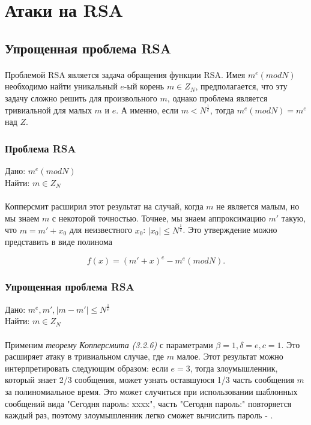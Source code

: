 
\section{Атаки на RSA}

\subsection{Упрощенная проблема RSA}

\paragraph{} Проблемой RSA является задача обращения функции RSA. Имея {$m^e (mod N)$} необходимо найти уникальный {$e$}-ый корень {$m \in Z_N$}, 
  предполагается, что эту задачу сложно решить для произвольного {$m$}, однако проблема является тривиальной для малых {$m$} и {$e$}. А именно, если
  {$m < N^\frac{1}{e}$}, тогда {$m^e (mod N) = m^e$} над {$Z$}.
  
  \subsubsection{Проблема RSA}
  Дано: {$m^e (mod N)$} \\   
  Найти: {$m \in Z_N$}
  
\paragraph{} Копперсмит расширил этот результат на случай, когда {$m$} не является малым, но мы знаем {$m$} с некоторой точностью. Точнее, мы знаем аппроксимацию
  {$m'$} такую, что {$m = m' + x_0$} для неизвестного {$x_0$}: {$|x_0| \le N^\frac{1}{e}$}. Это утверждение можно представить в виде полинома
  
    \begin{equation}
     f(x) = (m' + x)^e - m^e (mod N).
    \end{equation}
    
  \subsubsection{Упрощенная проблема RSA}
  Дано: {$m^e, m', |m-m'| \le N^\frac{1}{e}$} \\   
  Найти: {$m \in Z_N$}  
  
\paragraph{} Применим \textit{теорему Копперсмита (3.2.6)} с параметрами {$\beta = 1, \delta = e, c = 1$}. Это расширяет атаку в тривиальном случае, где {$m$} малое. Этот
  результат можно интерпретировать следующим образом: если {$e = 3$}, тогда злоумышленник, который знает 2/3 сообщения, может узнать оставшуюся
  1/3 часть сообщения {$m$} за полиномиальное время. Это может случиться при использовании шаблонных сообщений вида "Сегодня пароль: xxxx", часть 
  "Сегодня пароль:" повторяется каждый раз, поэтому злоумышленник легко сможет вычислить пароль - \cite[страницы 328-329]{may10}.
